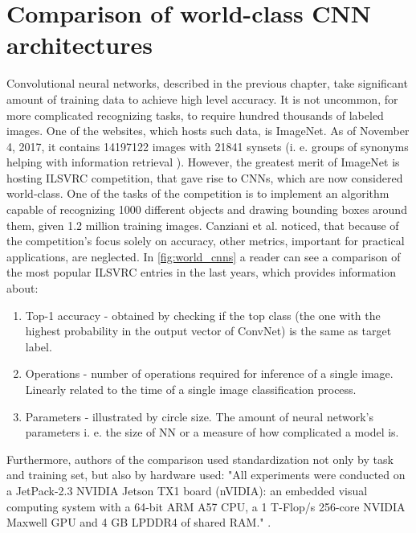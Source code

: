 \documentclass[11pt]{article}
\begin{document}
\section{Comparison of world-class CNN architectures} \label{comparison_ccn_archs}
Convolutional neural networks, described in the previous chapter, take significant amount of training data to achieve high level accuracy. It is not uncommon, for more complicated recognizing tasks, to require hundred thousands of labeled images. One of the websites, which hosts such data, is ImageNet. As of November 4, 2017, it contains 14197122 images with 21841 synsets (i. e. groups of synonyms helping with information retrieval \cite{synset_def}). However, the greatest merit of ImageNet is hosting ILSVRC competition, that gave rise to CNNs, which are now considered world-class. One of the tasks of the competition is to implement an algorithm capable of recognizing 1000 different objects and drawing bounding boxes around them, given 1.2 million training images. Canziani et al. \cite{canziani_analysis} noticed, that because of the competition's focus solely on accuracy, other metrics, important for practical applications, are neglected. In \autoref{fig:world_cnns} a reader can see a comparison of the most popular ILSVRC entries in the last years, which provides information about:
\begin{enumerate}[1)]
\item Top-1 accuracy - obtained by checking if the top class (the one with the highest probability in the output vector of ConvNet) is the same as target label.
\item Operations - number of operations required for inference of a single image. Linearly related to the time of a single image classification process.
\item Parameters - illustrated by circle size. The amount of neural network’s parameters i. e. the size of NN or a measure of how complicated a model is.
\end{enumerate}
Furthermore, authors of the comparison used standardization not only by task and training set, but also by hardware used: "All experiments were conducted on a JetPack-2.3 NVIDIA Jetson TX1 board (nVIDIA): an embedded visual computing system with a 64-bit ARM A57 CPU, a 1 T-Flop/s 256-core NVIDIA Maxwell GPU and 4 GB LPDDR4 of shared RAM." \cite{canziani_analysis}.
\end{document}
